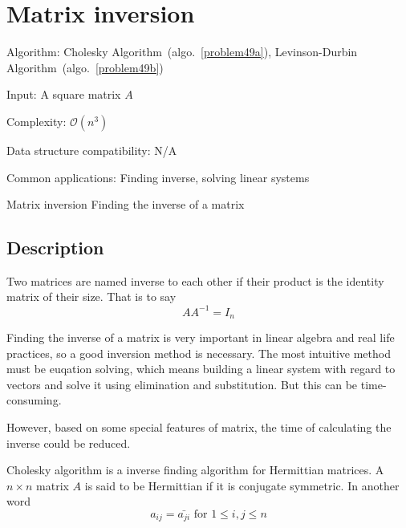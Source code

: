 \documentclass{article}
\begin{document}
\fi

%
%

\def\pbname{Matrix inversion} %

\section{\pbname} 

\begin{overview}
\item [Algorithm:] Cholesky Algorithm~(algo.~\ref{problem49a}), Levinson-Durbin Algorithm~(algo.~\ref{problem49b})
\item [Input:] A square matrix $A$
\item [Complexity:] $\mathcal{O}(n^3)$
\item [Data structure compatibility:] N/A
\item [Common applications:] Finding inverse, solving linear systems
\end{overview}



\begin{problem}{\pbname}
	Finding the inverse of a matrix
\end{problem}

\subsection*{Description}
Two matrices are named inverse to each other if their product is the identity matrix of their size. That is to say $$AA^{-1}=I_n$$

Finding the inverse of a matrix is very important in linear algebra and real life practices, so a good inversion method is necessary. The most intuitive method must be euqation solving, which means building a linear system with regard to vectors and solve it using elimination and substitution. But this can be time-consuming.

However, based on some special features of matrix, the time of calculating the inverse could be reduced. 

Cholesky algorithm is a inverse finding algorithm for Hermittian matrices. A $n\times n$ matrix $A$ is said to be Hermittian if it is conjugate symmetric. In another word $$a_{ij} = \bar{a_{ji}} \text{ for } 1\leq i,j \leq n$$
\end{document}
